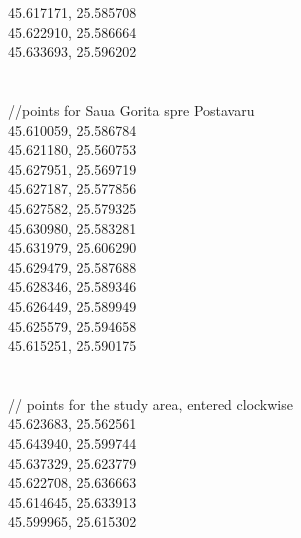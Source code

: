 \documentclass {article}
\begin{document}
\begin{appendices}
45.617171, 25.585708\\
45.622910, 25.586664\\
45.633693, 25.596202\\
\\
\\
//points for Saua Gorita spre Postavaru\\
45.610059, 25.586784\\
45.621180, 25.560753\\
45.627951, 25.569719\\
45.627187, 25.577856\\
45.627582, 25.579325\\
45.630980, 25.583281\\
45.631979, 25.606290\\
45.629479, 25.587688\\
45.628346, 25.589346\\
45.626449, 25.589949\\
45.625579, 25.594658\\
45.615251, 25.590175\\
\\
\\
// points for the study area, entered clockwise\\
45.623683, 25.562561\\
45.643940, 25.599744\\
45.637329, 25.623779\\
45.622708, 25.636663\\
45.614645, 25.633913\\
45.599965, 25.615302\\
\\
\\


\end{appendices}
\end{document}
